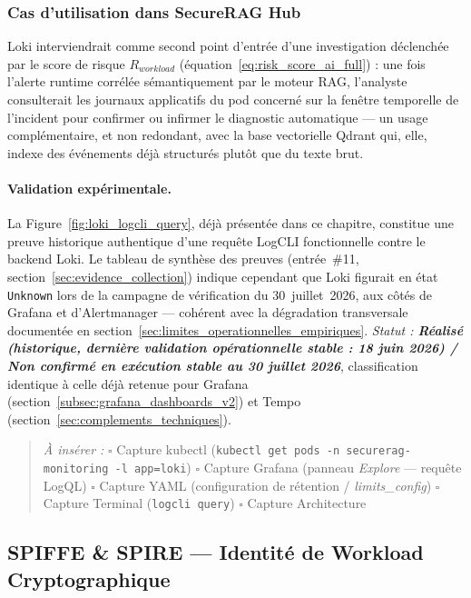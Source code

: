 \subsubsection{Cas d'utilisation dans SecureRAG Hub}
Loki interviendrait comme second point d'entrée d'une investigation déclenchée par le score de risque $R_{workload}$ (équation~\ref{eq:risk_score_ai_full}) : une fois l'alerte runtime corrélée sémantiquement par le moteur RAG, l'analyste consulterait les journaux applicatifs du pod concerné sur la fenêtre temporelle de l'incident pour confirmer ou infirmer le diagnostic automatique — un usage complémentaire, et non redondant, avec la base vectorielle Qdrant qui, elle, indexe des événements déjà structurés plutôt que du texte brut.

\paragraph{Validation expérimentale.}
La Figure~\ref{fig:loki_logcli_query}, déjà présentée dans ce chapitre, constitue une preuve historique authentique d'une requête LogCLI fonctionnelle contre le backend Loki. Le tableau de synthèse des preuves (entrée~\#11, section~\ref{sec:evidence_collection}) indique cependant que Loki figurait en état \texttt{Unknown} lors de la campagne de vérification du 30~juillet~2026, aux côtés de Grafana et d'Alertmanager — cohérent avec la dégradation transversale documentée en section~\ref{sec:limites_operationnelles_empiriques}. \textit{Statut : \textbf{Réalisé (historique, dernière validation opérationnelle stable : 18 juin 2026) / Non confirmé en exécution stable au 30 juillet 2026}}, classification identique à celle déjà retenue pour Grafana (section~\ref{subsec:grafana_dashboards_v2}) et Tempo (section~\ref{sec:complements_techniques}).

\begin{quote}
\scriptsize
\textit{À insérer :} \quad
$\square$ Capture kubectl (\texttt{kubectl get pods -n securerag-monitoring -l app=loki}) \quad
$\square$ Capture Grafana (panneau \textit{Explore} — requête LogQL) \quad
$\square$ Capture YAML (configuration de rétention / \textit{limits\_config}) \quad
$\square$ Capture Terminal (\texttt{logcli query}) \quad
$\square$ Capture Architecture
\end{quote}

\subsection{SPIFFE \& SPIRE — Identité de Workload Cryptographique}
\label{subsec:spiffe_spire_v2}

